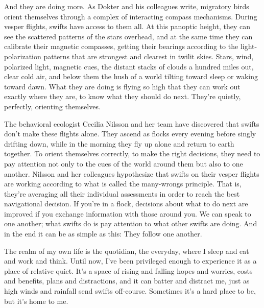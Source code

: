 And they are doing more. As Dokter and his colleagues write, migratory
birds orient themselves through a complex of interacting compass
mechanisms. During vesper flights, swifts have access to them all. At
this panoptic height, they can see the scattered patterns of the stars
overhead, and at the same time they can calibrate their magnetic
compasses, getting their bearings according to the light-polarization
patterns that are strongest and clearest in twilit skies. Stars, wind,
polarized light, magnetic cues, the distant stacks of clouds a hundred
miles out, clear cold air, and below them the hush of a world tilting
toward sleep or waking toward dawn. What they are doing is flying so
high that they can work out exactly where they are, to know what they
should do next. They're quietly, perfectly, orienting themselves.

The behavioral ecologist Cecilia Nilsson and her team have discovered
that swifts don't make these flights alone. They ascend as flocks every
evening before singly drifting down, while in the morning they fly up
alone and return to earth together. To orient themselves correctly, to
make the right decisions, they need to pay attention not only to the
cues of the world around them but also to one another. Nilsson and her
colleagues hypothesize that swifts on their vesper flights are working
according to what is called the many-wrongs principle. That is, they're
averaging all their individual assessments in order to reach the best
navigational decision. If you're in a flock, decisions about what to do
next are improved if you exchange information with those around you. We
can speak to one another; what swifts do is pay attention to what other
swifts are doing. And in the end it can be as simple as this: They
follow one another.

The realm of my own life is the quotidian, the everyday, where I sleep
and eat and work and think. Until now, I've been privileged enough to
experience it as a place of relative quiet. It's a space of rising and
falling hopes and worries, costs and benefits, plans and distractions,
and it can batter and distract me, just as high winds and rainfall send
swifts off-course. Sometimes it's a hard place to be, but it's home to
me.

